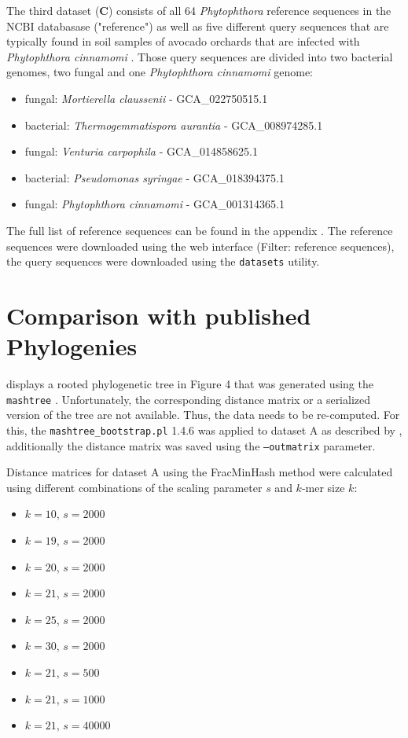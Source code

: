 The third dataset (\textbf{C}) consists of all 64 \textit{Phytophthora}
reference sequences in the NCBI databasase ("reference") as well as five
different query sequences that are typically found in soil samples of avocado
orchards that are infected with \textit{Phytophthora cinnamomi}
\cite{solis-garciaPhytophthoraRootRot2020}. Those query sequences are divided
into two bacterial genomes, two fungal and one \textit{Phytophthora cinnamomi}
genome:

\begin{itemize}
  \item fungal: \textit{Mortierella claussenii} - GCA\_022750515.1
  \item bacterial: \textit{Thermogemmatispora aurantia} - GCA\_008974285.1
  \item fungal: \textit{Venturia carpophila} - GCA\_014858625.1
  \item bacterial: \textit{Pseudomonas syringae} - GCA\_018394375.1
  \item fungal: \textit{Phytophthora cinnamomi} - GCA\_001314365.1
\end{itemize}

The full list of reference sequences can be found in the appendix .
The reference sequences were downloaded using the web interface (Filter:
reference sequences), the query sequences were downloaded using the
\texttt{datasets} utility.



\section{Comparison with published Phylogenies}
\cite{mandalComparativeGenomeAnalysis2022} displays a rooted phylogenetic tree
in Figure 4 that was generated using the \texttt{mashtree}
\cite{katzMashtreeRapidComparison2019,ondovMashFastGenome2016}. Unfortunately,
the corresponding distance matrix or a serialized version of the tree are not
available. Thus, the data needs to be re-computed. For this, the
\texttt{mashtree\_bootstrap.pl} 1.4.6 was applied to dataset A as described by
\cite{mandalComparativeGenomeAnalysis2022}, additionally the distance matrix was
saved using the \texttt{--outmatrix} parameter.

Distance matrices for dataset A using the FracMinHash method were calculated using different
combinations of the scaling parameter $s$ and $k$-mer size $k$:

\begin{itemize}
  \item $k=10$, $s=2000$
  \item $k=19$, $s=2000$
  \item $k=20$, $s=2000$
  \item $k=21$, $s=2000$
  \item $k=25$, $s=2000$
  \item $k=30$, $s=2000$
  \item $k=21$, $s=500$
  \item $k=21$, $s=1000$
  \item $k=21$, $s=40000$
\end{itemize}

